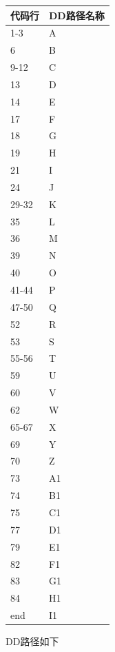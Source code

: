 \documentclass[12pt, a4paper, oneside]{ctexart}
\begin{document}
\begin{longtable}{|l|l|}
    \hline
    代码行 & DD路径名称\\ \hline
    1-3 & A\\ \hline
    6 & B\\ \hline
    9-12 & C \\ \hline
    13 & D \\ \hline
    14 & E \\ \hline
    17 & F \\ \hline
    18 & G \\ \hline
    19 & H \\ \hline
    21 & I \\ \hline
    24 & J \\ \hline
    29-32 & K \\ \hline
    35 & L \\ \hline
    36 & M \\ \hline
    39 & N \\ \hline
    40 & O \\ \hline
    41-44 & P \\ \hline
    47-50 & Q \\ \hline
    52 & R \\ \hline
    53 & S \\ \hline
    55-56 & T \\ \hline
    59 & U \\ \hline
    60 & V \\ \hline
    62 & W \\ \hline
    65-67 & X \\ \hline
    69 & Y \\ \hline
    70 & Z \\ \hline
    73 & A1 \\ \hline
    74 & B1 \\ \hline
    75 & C1 \\ \hline
    77 & D1 \\ \hline
    79 & E1 \\ \hline
    82 & F1 \\ \hline
    83 & G1 \\ \hline
    84 & H1 \\ \hline
    end & I1 \\ \hline
\end{longtable}

DD路径如下
\end{document}
